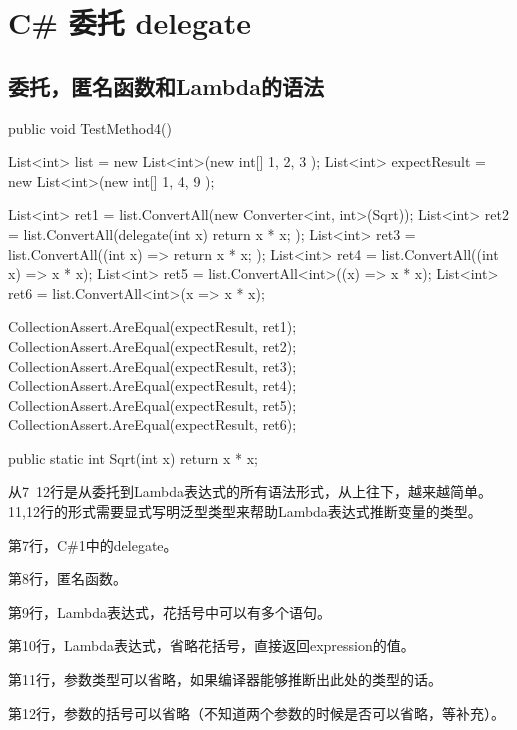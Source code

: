 

\chapter{C\# 委托 delegate}



\section{委托，匿名函数和Lambda的语法}


\begin{CSharp}[委托，匿名函数和Lambda]
        [TestMethod]
        public void TestMethod4()
        {
            List<int> list = new List<int>(new int[] { 1, 2, 3 });
            List<int> expectResult = new List<int>(new int[] { 1, 4, 9 });

            List<int> ret1 = list.ConvertAll(new Converter<int, int>(Sqrt));
            List<int> ret2 = list.ConvertAll(delegate(int x) { return x * x; });
            List<int> ret3 = list.ConvertAll((int x) => { return x * x; });
            List<int> ret4 = list.ConvertAll((int x) => x * x);
            List<int> ret5 = list.ConvertAll<int>((x) => x * x);
            List<int> ret6 = list.ConvertAll<int>(x => x * x);

            CollectionAssert.AreEqual(expectResult, ret1);
            CollectionAssert.AreEqual(expectResult, ret2);
            CollectionAssert.AreEqual(expectResult, ret3);
            CollectionAssert.AreEqual(expectResult, ret4);
            CollectionAssert.AreEqual(expectResult, ret5);
            CollectionAssert.AreEqual(expectResult, ret6);
        }

        public static int Sqrt(int x)
        {
            return x * x;
        }
\end{CSharp}

从7~12行是从委托到Lambda表达式的所有语法形式，从上往下，越来越简单。11,12行的形式需要显式写明泛型类型来帮助Lambda表达式推断变量的类型。


第7行，C\#1中的delegate。

第8行，匿名函数。

第9行，Lambda表达式，花括号中可以有多个语句。

第10行，Lambda表达式，省略花括号，直接返回expression的值。

第11行，参数类型可以省略，如果编译器能够推断出此处的类型的话。

第12行，参数的括号可以省略（不知道两个参数的时候是否可以省略，等补充）。


